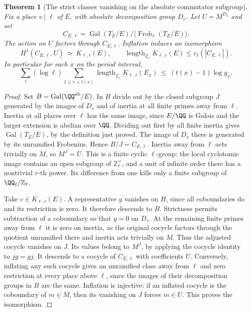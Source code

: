 \documentclass[a4paper,11pt]{article}
\newtheorem{theorem}[proposition]{Theorem}
\theoremstyle{definition}
\theoremstyle{remark}
\newcommand{\ZZ}{\mathbb Z}\newcommand{\ord}{\operatorname{ord}}
\numberwithin{equation}{section}
\begin{document}
\begin{theorem}[The strict classes vanishing on the absolute commutator subgroup]
\leavevmode\label{thm:genuskernel601}
Fix a place \(v\mid\ell\) of \(E\), with absolute
decomposition group \(D_v\). Let \(U=M^{D_v}\) and set
\[
   C_{E,\ell}=\operatorname{Gal}(T_E/E)/
            \langle\operatorname{Frob}_v(T_E/E)\rangle .
\]
The action on \(U\) factors through \(C_{E,\ell}\).
Inflation induces an isomorphism
\[
     H^1(C_{E,\ell},U)\ \simeq\ K_{\ell,r}(E),\qquad
     \operatorname{length}_{\ZZ_\ell}K_{\ell,r}(E)
                    \le v_\ell(|C_{E,\ell}|).
\]
In particular for each \(x\) on the period interval,
\[
 \sum_{\ell}(\log\ell)\sum_{1\le r<t(x)}
          \operatorname{length}_{\ZZ_\ell}K_{\ell,r}(E_x)
          \ \le\ (t(x)-1)\log g_\psi .
\]
\end{theorem}
\begin{proof}
Set \(B=\operatorname{Gal}(\QQ^{\rm ab}/E)\).
In \(B\) divide out by the closed subgroup \(J\)
generated by the images of \(D_v\) and of inertia
at all finite primes away from \(\ell\). Inertia at all
places over \(\ell\) has the same image, since \(E/\QQ\)
is Galois and the larger extension is abelian over \(\QQ\).
Dividing out first by all finite inertia gives
\(\operatorname{Gal}(T_E/E)\), by the definition just
proved. The image of \(D_v\) there is generated by its
unramified Frobenius. Hence \(B/J=C_{E,\ell}\).
Inertia away from \(\ell\) acts trivially on \(M\),
so \(M^J=U\). This is a finite cyclic \(\ell\)-group:
the local cyclotomic image contains an open subgroup
of \(\ZZ_\ell^\times\), and a unit of infinite order
there has a nontrivial \(r\)-th power. Its difference
from one kills only a finite subgroup of \(\QQ_\ell/\ZZ_\ell\).

Take \(c\in K_{\ell,r}(E)\). A representative \(y\)
vanishes on \(H\), since all coboundaries do and its
restriction is zero. It therefore descends to \(B\).
Strictness permits subtraction of a coboundary so that
\(y=0\) on \(D_v\). At the remaining finite primes
away from \(\ell\) it is zero on inertia, as the
original cocycle factors through the quotient unramified
there and inertia acts trivially on \(M\). Thus the
adjusted cocycle vanishes on \(J\). Its values belong
to \(M^J\), by applying the cocycle identity to
\(jg=gj\). It descends to a cocycle of \(C_{E,\ell}\)
with coefficients \(U\). Conversely, inflating any
such cocycle gives an unramified class away from \(\ell\)
and zero restriction at every place above \(\ell\),
since the images of their decomposition groups in \(B\)
are the same. Inflation is injective: if an inflated
cocycle is the coboundary of \(m\in M\), then its
vanishing on \(J\) forces \(m\in U\). This proves the
isomorphism.


\end{proof}
\end{document}
